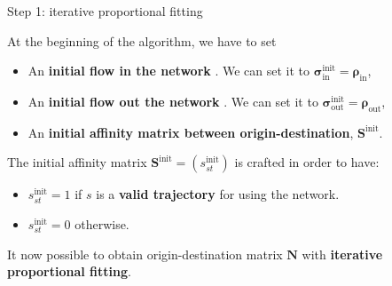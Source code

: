 \documentclass[10pt]{beamer}
\newcommand{\imp}[1]{\textbf{\color{cyan}#1}}
\begin{document}
	
	\begin{frame}{Step 1: iterative proportional fitting}
		
		At the beginning of the algorithm, we have to set 
		\begin{itemize}
			\item An \imp{initial flow in the network }. We can set it to $\bm{\sigma}^\text{init}_\text{in} = \bm{\rho}_\text{in}$,
			\item An \imp{initial flow out the network }. We can set it to $\bm{\sigma}^\text{init}_\text{out} = \bm{\rho}_\text{out}$,
			\item An \imp{initial affinity matrix between origin-destination}, $\mathbf{S}^\text{init}$.
		\end{itemize}  
	
		The initial affinity matrix $\mathbf{S}^\text{init} = (s^\text{init}_{st})$ is crafted in order to have:
		\begin{itemize}
			\item $s^\text{init}_{st} = 1$ if $s$ is a \imp{valid trajectory} for using the network.
			\item $s^\text{init}_{st} = 0$ otherwise.
		\end{itemize}
		
		It now possible to obtain origin-destination matrix $\mathbf{N}$ with \imp{iterative proportional fitting}.
		
	\end{frame}
	
	
\end{document}
